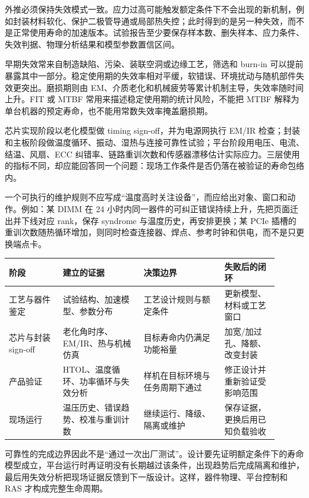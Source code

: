 外推必须保持失效模式一致。应力过高可能触发额定条件下不会出现的新机制，例如封装材料软化、保护二极管导通或局部热失控；此时得到的是另一种失效，而不是正常使用寿命的加速版本。试验报告至少要保存样本数、删失样本、应力条件、失效判据、物理分析结果和模型参数置信区间。


早期失效常来自制造缺陷、污染、装联空洞或边缘工艺，筛选和 burn-in 可以提前暴露其中一部分。稳定使用期的失效率相对平缓，软错误、环境扰动与随机部件失效更突出。磨损期则由 EM、介质老化和机械疲劳等累计机制主导，失效率随时间上升。FIT 或 MTBF 常用来描述稳定使用期的统计风险，不能把 MTBF 解释为单台机器的预定寿命，也不能用常数失效率掩盖磨损期。


芯片实现阶段以老化模型做 timing sign-off，并为电源网执行 EM/IR 检查；封装和主板阶段做温度循环、振动、湿热与连接可靠性试验；平台阶段用电压、电流、结温、风扇、ECC 纠错率、链路重训次数和传感器漂移估计实际应力。三层使用的指标不同，却应能回答同一个问题：现场工作条件是否仍落在被验证的寿命包络内。

一个可执行的维护规则不应写成“温度高时关注设备”，而应给出对象、窗口和动作。例如：某 DIMM 在 24 小时内同一器件的可纠正错误持续上升，先把页面迁出并下线对应 rank，保存 syndrome 与温度历史，再安排更换；某 PCIe 插槽的重训次数随热循环增加，则同时检查连接器、焊点、参考时钟和供电，而不是只更换端点卡。

\begin{longtable}{L{0.18\linewidth}L{0.27\linewidth}L{0.27\linewidth}L{0.18\linewidth}}
\toprule
阶段 & 建立的证据 & 决策边界 & 失败后的闭环 \\
\midrule
工艺与器件鉴定 & 试验结构、加速模型、参数分布 & 工艺设计规则与额定条件 & 更新模型、材料或工艺窗口 \\\tablerowrule
芯片与封装 sign-off & 老化角时序、EM/IR、热与机械仿真 & 目标寿命内仍满足功能裕量 & 加宽/加过孔、降额、改变封装 \\\tablerowrule
产品验证 & HTOL、温度循环、功率循环与失效分析 & 样机在目标环境与任务周期下通过 & 修正设计并重新验证受影响范围 \\\tablerowrule
现场运行 & 温压历史、错误趋势、校准与重训计数 & 继续运行、降级、隔离或维护 & 保存证据，更换后用已知负载验收 \\
\bottomrule
\end{longtable}

可靠性的完成边界因此不是“通过一次出厂测试”。设计要先证明额定条件下的寿命模型成立，平台运行时再证明没有长期越过该条件，出现趋势后完成隔离和维护，最后用失效分析把现场证据反馈到下一版设计。这样，器件物理、平台控制和 RAS 才构成完整生命周期。
